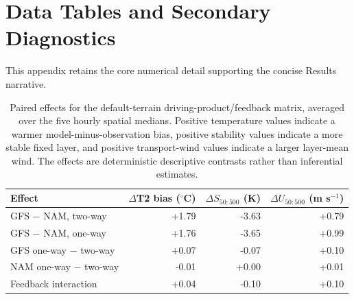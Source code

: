 \documentclass[air,article,submit,moreauthors]{Definitions/mdpi}
\begin{document}
\appendixstart
\appendix
\section{Data Tables and Secondary Diagnostics}
\label{app:v3-data}

This appendix retains the core numerical detail supporting the concise Results narrative.

\begin{table}[H]
\caption{Paired effects for the default-terrain driving-product/feedback matrix, averaged over the five hourly spatial medians.
Positive temperature values indicate a warmer model-minus-observation bias, positive stability values indicate a more stable fixed layer, and positive transport-wind values indicate a larger layer-mean wind.
The effects are deterministic descriptive contrasts rather than inferential estimates.}
\label{tab:v3-effects}
\centering
\begin{tabular}{lrrr}
\toprule
Effect & $\Delta$T2 bias ($^{\circ}$C) & $\Delta S_{50:500}$ (K) & $\Delta U_{50:500}$ (m s$^{-1}$) \\
\midrule
GFS $-$ NAM, two-way & +1.79 & -3.63 & +0.79 \\
GFS $-$ NAM, one-way & +1.76 & -3.65 & +0.99 \\
GFS one-way $-$ two-way & +0.07 & -0.07 & +0.10 \\
NAM one-way $-$ two-way & -0.01 & +0.00 & +0.01 \\
Feedback interaction & +0.04 & -0.10 & +0.10 \\
\bottomrule
\end{tabular}
\end{table}
\end{document}
